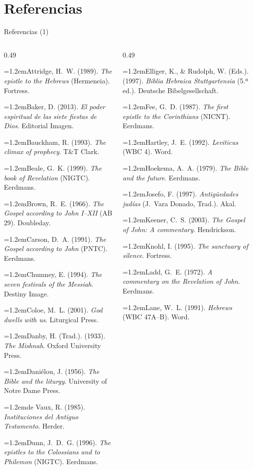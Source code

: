 \documentclass[hyperref={bookmarks=false},aspectratio=169]{beamer}
\newcommand{\refapa}[1]{\par{\RaggedRight\hangindent=1.2em\hangafter=1\noindent #1\par}\vspace{3pt}}
\begin{document}
\section{Referencias}

\begin{frame}{Referencias (1)}
\fontsize{6}{7.2}\selectfont
\begin{columns}[t,onlytextwidth]
\begin{column}{0.49\textwidth}
\refapa{Attridge, H.~W. (1989). \emph{The epistle to the Hebrews} (Hermeneia). Fortress.}
\refapa{Baker, D. (2013). \emph{El poder espiritual de las siete fiestas de Dios}. Editorial Imagen.}
\refapa{Bauckham, R. (1993). \emph{The climax of prophecy}. T\&T Clark.}
\refapa{Beale, G.~K. (1999). \emph{The book of Revelation} (NIGTC). Eerdmans.}
\refapa{Brown, R.~E. (1966). \emph{The Gospel according to John I--XII} (AB 29). Doubleday.}
\refapa{Carson, D.~A. (1991). \emph{The Gospel according to John} (PNTC). Eerdmans.}
\refapa{Chumney, E. (1994). \emph{The seven festivals of the Messiah}. Destiny Image.}
\refapa{Coloe, M.~L. (2001). \emph{God dwells with us}. Liturgical Press.}
\refapa{Danby, H. (Trad.). (1933). \emph{The Mishnah}. Oxford University Press.}
\refapa{Daniélou, J. (1956). \emph{The Bible and the liturgy}. University of Notre Dame Press.}
\refapa{de Vaux, R. (1985). \emph{Instituciones del Antiguo Testamento}. Herder.}
\refapa{Dunn, J.~D.~G. (1996). \emph{The epistles to the Colossians and to Philemon} (NIGTC). Eerdmans.}
\end{column}
\begin{column}{0.49\textwidth}
\refapa{Elliger, K., \& Rudolph, W. (Eds.). (1997). \emph{Biblia Hebraica Stuttgartensia} (5.ª ed.). Deutsche Bibelgesellschaft.}
\refapa{Fee, G.~D. (1987). \emph{The first epistle to the Corinthians} (NICNT). Eerdmans.}
\refapa{Hartley, J.~E. (1992). \emph{Leviticus} (WBC 4). Word.}
\refapa{Hoekema, A.~A. (1979). \emph{The Bible and the future}. Eerdmans.}
\refapa{Josefo, F. (1997). \emph{Antigüedades judías} (J.~Vara Donado, Trad.). Akal.}
\refapa{Keener, C.~S. (2003). \emph{The Gospel of John: A commentary}. Hendrickson.}
\refapa{Knohl, I. (1995). \emph{The sanctuary of silence}. Fortress.}
\refapa{Ladd, G.~E. (1972). \emph{A commentary on the Revelation of John}. Eerdmans.}
\refapa{Lane, W.~L. (1991). \emph{Hebrews} (WBC 47A--B). Word.}
\end{column}
\end{columns}
\end{frame}
\end{document}
